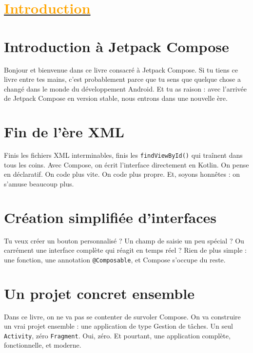 \section{\hyperref[sec:summary]{\textcolor{orange}{Introduction}}}\label{sec:intro}
\noindent
\noindent
\begin{minipage}[t]{0.48\textwidth}
\section*{Introduction à Jetpack Compose}

Bonjour et bienvenue dans ce livre consacré à Jetpack Compose.  
Si tu tiens ce livre entre tes mains, c’est probablement parce que tu sens que quelque chose a changé dans le monde du développement Android.  
Et tu as raison : avec l’arrivée de Jetpack Compose en version stable, nous entrons dans une nouvelle ère.  

\vspace{2em} %

\section*{Fin de l’ère XML}

Finis les fichiers XML interminables, finis les \texttt{findViewById()} qui traînent dans tous les coins.  
Avec Compose, on écrit l’interface directement en Kotlin.  
On pense en déclaratif.  
On code plus vite.  
On code plus propre.  
Et, soyons honnêtes : on s’amuse beaucoup plus.  
\end{minipage}
\hfill
\begin{minipage}[t]{0.48\textwidth}
\section*{Création simplifiée d’interfaces}

Tu veux créer un bouton personnalisé ?  
Un champ de saisie un peu spécial ?  
Ou carrément une interface complète qui réagit en temps réel ?  
Rien de plus simple : une fonction, une annotation \texttt{@Composable}, et Compose s’occupe du reste.  

\vspace{2em} %

\section*{Un projet concret ensemble}

Dans ce livre, on ne va pas se contenter de survoler Compose.  
On va construire un vrai projet ensemble : une application de type Gestion de tâches.  
Un seul \texttt{Activity}, zéro \texttt{Fragment}. Oui, zéro.  
Et pourtant, une application complète, fonctionnelle, et moderne.  
\end{minipage}
